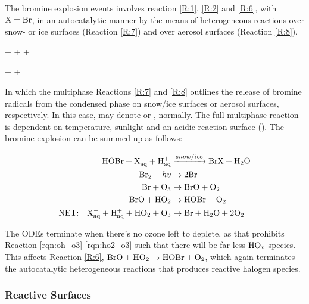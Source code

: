 The bromine explosion events involves reaction \ref{R:1}, \ref{R:2} and \ref{R:6}, with $\mathrm{X} = \mathrm{Br}$, in an autocatalytic manner by the means of heterogeneous reactions over snow- or ice surfaces (Reaction \ref{R:7}) and over aerosol surfaces (Reaction \ref{R:8}). 

\begin{reaction}
     +  +    +  \label{R:7} 
\end{reaction}
\begin{reaction}
     +    +  \label{R:8}
\end{reaction}


In which the multiphase Reactions \ref{R:7} and \ref{R:8} outlines the release of bromine radicals from the condensed phase on snow/ice surfaces or aerosol surfaces, respectively. In this case,  may denote  or , normally. The full multiphase reaction is dependent on temperature, sunlight and an acidic reaction surface (\cite{Toyota}). The bromine explosion can be summed up as follows: 

\begin{align*}
    \mathrm{HOBr} + \mathrm{X^-_{aq}} + \mathrm{H^+_{aq}} &\xrightarrow{snow/ice} \mathrm{BrX} + \mathrm{H_2O} \\
    \mathrm{Br_2} + hv &\rightarrow 2\mathrm{Br} \\
    \mathrm{Br} + \mathrm{O_3} &\rightarrow \mathrm{BrO} + \mathrm{O_2} \\
    \mathrm{BrO} + \mathrm{HO_2} &\rightarrow \mathrm{HOBr} + \mathrm{O_2} \\
    \text{NET:} \quad \mathrm{X^-_{aq}} + \mathrm{H^+_{aq}} + \mathrm{HO_2} + \mathrm{O_3}  &\rightarrow \mathrm{Br} + \mathrm{H_2O} + 2\mathrm{O_2} 
\end{align*}

\medskip

The ODEs terminate when there's no ozone left to deplete, as that prohibits Reaction \ref{rqn:oh_o3}-\ref{rqn:ho2_o3} such that there will be far less $\mathrm{HO_x}$-species. This affects Reaction \ref{R:6}, $\mathrm{BrO} + \mathrm{HO_2} \rightarrow \mathrm{HOBr} + \mathrm{O_2}$, which again terminates the autocatalytic heterogeneous reactions that produces reactive halogen species. 

\subsubsection{Reactive Surfaces}

